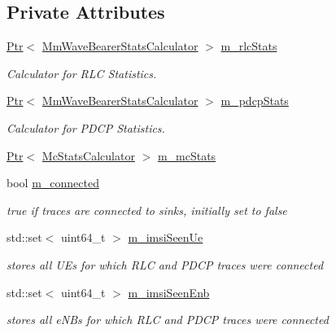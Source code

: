 \subsection*{Private Attributes}
\begin{DoxyCompactItemize}
\item 
\hyperlink{classns3_1_1Ptr}{Ptr}$<$ \hyperlink{classns3_1_1MmWaveBearerStatsCalculator}{Mm\+Wave\+Bearer\+Stats\+Calculator} $>$ \hyperlink{classns3_1_1MmWaveBearerStatsConnector_a3613ebbbe92cd828e66b03c91c7ebcbb}{m\+\_\+rlc\+Stats}
\begin{DoxyCompactList}\small\item\em Calculator for R\+LC Statistics. \end{DoxyCompactList}\item 
\hyperlink{classns3_1_1Ptr}{Ptr}$<$ \hyperlink{classns3_1_1MmWaveBearerStatsCalculator}{Mm\+Wave\+Bearer\+Stats\+Calculator} $>$ \hyperlink{classns3_1_1MmWaveBearerStatsConnector_a6523c73cc057ed84faa3ddfc944ff67f}{m\+\_\+pdcp\+Stats}
\begin{DoxyCompactList}\small\item\em Calculator for P\+D\+CP Statistics. \end{DoxyCompactList}\item 
\hyperlink{classns3_1_1Ptr}{Ptr}$<$ \hyperlink{classns3_1_1McStatsCalculator}{Mc\+Stats\+Calculator} $>$ \hyperlink{classns3_1_1MmWaveBearerStatsConnector_a7c33409f7f21ab2d63c722886c1ab8bd}{m\+\_\+mc\+Stats}
\item 
bool \hyperlink{classns3_1_1MmWaveBearerStatsConnector_a2b34cc3a64fe43622592782563e55441}{m\+\_\+connected}
\begin{DoxyCompactList}\small\item\em true if traces are connected to sinks, initially set to false \end{DoxyCompactList}\item 
std\+::set$<$ uint64\+\_\+t $>$ \hyperlink{classns3_1_1MmWaveBearerStatsConnector_afb8aece9b3dd8655bbc1937b176341fb}{m\+\_\+imsi\+Seen\+Ue}
\begin{DoxyCompactList}\small\item\em stores all U\+Es for which R\+LC and P\+D\+CP traces were connected \end{DoxyCompactList}\item 
std\+::set$<$ uint64\+\_\+t $>$ \hyperlink{classns3_1_1MmWaveBearerStatsConnector_acf91c8fd35016bd612a8b9640a58a301}{m\+\_\+imsi\+Seen\+Enb}
\begin{DoxyCompactList}\small\item\em stores all e\+N\+Bs for which R\+LC and P\+D\+CP traces were connected \end{DoxyCompactList}\item 

\end{DoxyCompactItemize}
